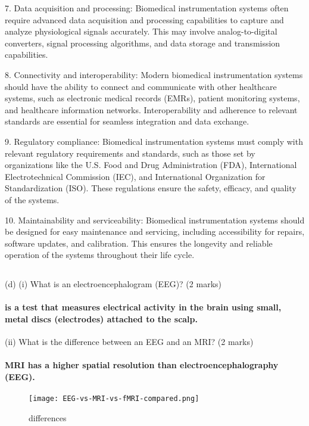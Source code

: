 \documentclass[article]{article}
\begin{document}
{7. Data acquisition and processing: Biomedical instrumentation systems often require advanced data acquisition and processing capabilities to capture and analyze physiological signals accurately. This may involve analog-to-digital converters, signal processing algorithms, and data storage and transmission capabilities.

8. Connectivity and interoperability: Modern biomedical instrumentation systems should have the ability to connect and communicate with other healthcare systems, such as electronic medical records (EMRs), patient monitoring systems, and healthcare information networks. Interoperability and adherence to relevant standards are essential for seamless integration and data exchange.

9. Regulatory compliance: Biomedical instrumentation systems must comply with relevant regulatory requirements and standards, such as those set by organizations like the U.S. Food and Drug Administration (FDA), International Electrotechnical Commission (IEC), and International Organization for Standardization (ISO). These regulations ensure the safety, efficacy, and quality of the systems.

10. Maintainability and serviceability: Biomedical instrumentation systems should be designed for easy maintenance and servicing, including accessibility for repairs, software updates, and calibration. This ensures the longevity and reliable operation of the systems throughout their life cycle.
}
\subsection*{}(d) (i) What is an electroencephalogram (EEG)? (2 marks)
\paragraph{is a test that measures electrical activity in the brain using small, metal discs (electrodes) attached to the scalp.}

(ii) What is the difference between an EEG and an MRI? (2 marks)
\paragraph{MRI has a higher spatial resolution than electroencephalography (EEG).}

\begin{figure}[htp]
    \centering
    \texttt{[image: EEG-vs-MRI-vs-fMRI-compared.png]}
    \caption{differences}
    \label{fig:differences}
\end{figure}
\end{document}
